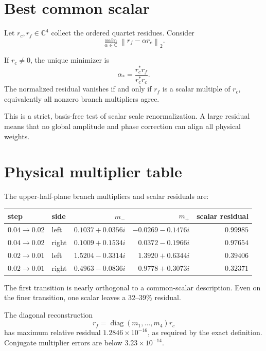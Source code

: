 \documentclass[12pt]{article}
\theoremstyle{remark}\newtheorem{remark}[theorem]{Remark}
\newcommand{\norm}[1]{\left\lVert#1\right\rVert}
\begin{document}
\section{Best common scalar}

Let $r_c,r_f\in\mathbb C^4$ collect the ordered quartet residues.  Consider
\begin{equation}\label{eq:ls}
 \min_{\alpha\in\mathbb C}\norm{r_f-\alpha r_c}_2.
\end{equation}

\begin{proposition}\label{prop:scalar}
If $r_c\ne0$, the unique minimizer is
\begin{equation}\label{eq:alpha}
 \alpha_*=\frac{r_c^*r_f}{r_c^*r_c}.
\end{equation}
The normalized residual vanishes if and only if $r_f$ is a scalar multiple
of $r_c$, equivalently all nonzero branch multipliers agree.
\end{proposition}

This is a strict, basis-free test of scalar scale renormalization.  A large
residual means that no global amplitude and phase correction can align all
physical weights.

\section{Physical multiplier table}

The upper-half-plane branch multipliers and scalar residuals are:
\begin{center}
\small
\begin{tabular}{llrrr}
\toprule
step & side & $m_-$ & $m_+$ & scalar residual\\
\midrule
$0.04\to0.02$ & left
& $0.1037+0.0356i$ & $-0.0269-0.1476i$ & $0.99985$\\
$0.04\to0.02$ & right
& $0.1009+0.1534i$ & $0.0372-0.1966i$ & $0.97654$\\
$0.02\to0.01$ & left
& $1.5204-0.3314i$ & $1.3920+0.6344i$ & $0.39406$\\
$0.02\to0.01$ & right
& $0.4963-0.0836i$ & $0.9778+0.3073i$ & $0.32371$\\
\bottomrule
\end{tabular}
\end{center}
The first transition is nearly orthogonal to a common-scalar description.
Even on the finer transition, one scalar leaves a $32$--$39\%$ residual.

The diagonal reconstruction
\begin{equation*}
 r_f=\operatorname{diag}(m_1,\ldots,m_4)r_c
\end{equation*}
has maximum relative residual $1.2846\times10^{-16}$, as required by the
exact definition.  Conjugate multiplier errors are below
$3.23\times10^{-14}$.
\end{document}
